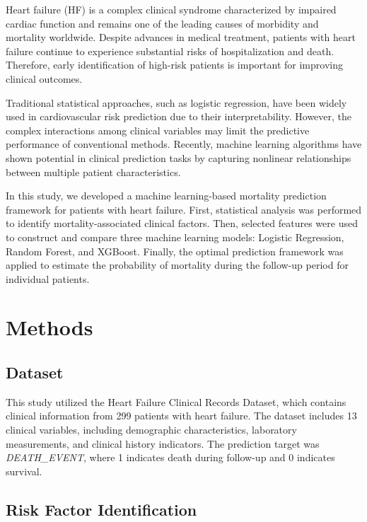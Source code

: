 \documentclass[11pt]{article}
\begin{document}
Heart failure (HF) is a complex clinical syndrome characterized by impaired
cardiac function and remains one of the leading causes of morbidity and mortality
worldwide. Despite advances in medical treatment, patients with heart failure
continue to experience substantial risks of hospitalization and death.
Therefore, early identification of high-risk patients is important for improving
clinical outcomes.


Traditional statistical approaches, such as logistic regression, have been widely
used in cardiovascular risk prediction due to their interpretability. However,
the complex interactions among clinical variables may limit the predictive
performance of conventional methods. Recently, machine learning algorithms have
shown potential in clinical prediction tasks by capturing nonlinear relationships
between multiple patient characteristics.


In this study, we developed a machine learning-based mortality prediction
framework for patients with heart failure. First, statistical analysis was
performed to identify mortality-associated clinical factors. Then, selected
features were used to construct and compare three machine learning models:
Logistic Regression, Random Forest, and XGBoost. Finally, the optimal prediction
framework was applied to estimate the probability of mortality during the
follow-up period for individual patients.



\section{Methods}


\subsection{Dataset}


This study utilized the Heart Failure Clinical Records Dataset, which contains
clinical information from 299 patients with heart failure. The dataset includes
13 clinical variables, including demographic characteristics, laboratory
measurements, and clinical history indicators. The prediction target was
\textit{DEATH\_EVENT}, where 1 indicates death during follow-up and 0 indicates
survival.


\subsection{Risk Factor Identification}
\end{document}
